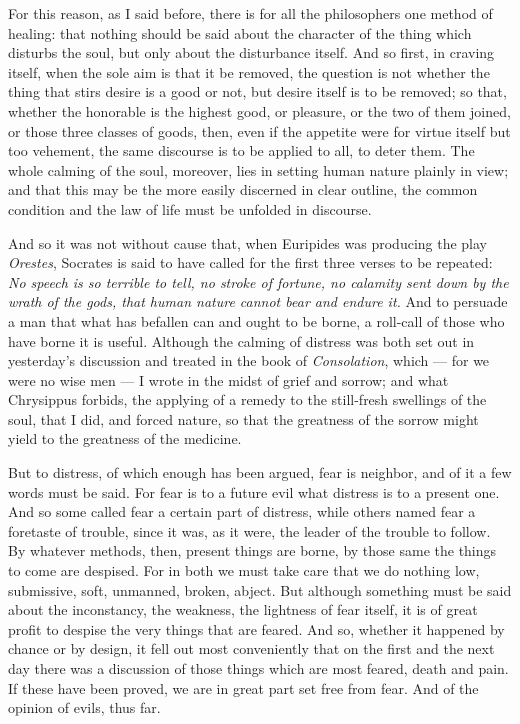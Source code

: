  For this reason, as I said before, there is for all the philosophers one method of healing: that nothing should be said about the character of the thing which disturbs the soul, but only about the disturbance itself. And so first, in craving itself, when the sole aim is that it be removed, the question is not whether the thing that stirs desire is a good or not, but desire itself is to be removed; so that, whether the honorable is the highest good, or pleasure, or the two of them joined, or those three classes of goods, then, even if the appetite were for virtue itself but too vehement, the same discourse is to be applied to all, to deter them. The whole calming of the soul, moreover, lies in setting human nature plainly in view; and that this may be the more easily discerned in clear outline, the common condition and the law of life must be unfolded in discourse.

 And so it was not without cause that, when Euripides was producing the play \textit{Orestes}, Socrates is said to have called for the first three verses to be repeated: \textit{No speech is so terrible to tell, no stroke of fortune, no calamity sent down by the wrath of the gods, that human nature cannot bear and endure it.} And to persuade a man that what has befallen can and ought to be borne, a roll-call of those who have borne it is useful. Although the calming of distress was both set out in yesterday's discussion and treated in the book of \textit{Consolation}, which — for we were no wise men — I wrote in the midst of grief and sorrow; and what Chrysippus forbids, the applying of a remedy to the still-fresh swellings of the soul, that I did, and forced nature, so that the greatness of the sorrow might yield to the greatness of the medicine.

 But to distress, of which enough has been argued, fear is neighbor, and of it a few words must be said. For fear is to a future evil what distress is to a present one. And so some called fear a certain part of distress, while others named fear a foretaste of trouble, since it was, as it were, the leader of the trouble to follow. By whatever methods, then, present things are borne, by those same the things to come are despised. For in both we must take care that we do nothing low, submissive, soft, unmanned, broken, abject. But although something must be said about the inconstancy, the weakness, the lightness of fear itself, it is of great profit to despise the very things that are feared. And so, whether it happened by chance or by design, it fell out most conveniently that on the first and the next day there was a discussion of those things which are most feared, death and pain. If these have been proved, we are in great part set free from fear. And of the opinion of evils, thus far.

